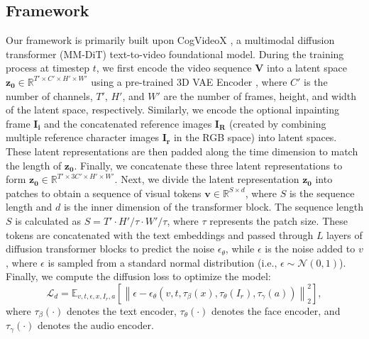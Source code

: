\subsection{Framework}
\label{framework}
Our framework is primarily built upon CogVideoX \cite{yang2024cogvideox}, a multimodal diffusion transformer (MM-DiT) text-to-video foundational model. During the training process at timestep $t$, we first encode the video sequence $\mathbf{V}$ into a latent space $\mathbf{z_{0}} \in \mathbb{R}^{T' \times C' \times H' \times W'}$ using a pre-trained 3D VAE Encoder \cite{yang2024cogvideox}, where $C'$ is the number of channels, $T'$, $H'$, and $W'$ are the number of frames, height, and width of the latent space, respectively. 
Similarly, we encode the optional inpainting frame $\mathbf{I_i}$ and the concatenated reference images $\mathbf{I_{R}}$ (created by combining multiple reference character images $\mathbf{I_r}$ in the RGB space) into latent spaces. These latent representations are then padded along the time dimension to match the length of $\mathbf{z_{0}}$. Finally, we concatenate these three latent representations to form $\mathbf{z_{0}} \in \mathbb{R}^{T' \times 3C' \times H' \times W'}$.
Next, we divide the latent representation $\mathbf{z_{0}}$ into patches to obtain a sequence of 
visual tokens \( \mathbf{v} \in \mathbb{R}^{S \times d} \), where \( S \) is the sequence length and \( d \) is the inner dimension of the transformer block. The sequence length \( S \) is calculated as \( S = T' \cdot H' / \tau \cdot W' / \tau \), where \( \tau \) represents the patch size. 
These tokens are concatenated with the text embeddings and passed through $L$ layers of diffusion transformer blocks to predict the noise $ \epsilon_\theta $, while $ \epsilon $ is the noise added to $ v $, where $ \epsilon $ is sampled from a standard normal distribution (i.e., $ \epsilon \sim \mathcal{N}(0, 1) $).
Finally, we compute the diffusion loss to optimize the model:
\begin{equation}
    \mathcal{L}_{d} = \mathbb{E}_{v, t, \epsilon, x, I_r, a} \left[ \left\| \epsilon - \epsilon_\theta\left(v, t, \tau_\beta(x), \tau_\theta(I_r), \tau_\gamma(a)\right) \right\|_2^2 \right],
\end{equation}
where \( \tau_\beta(\cdot) \) denotes the text encoder, \( \tau_\theta(\cdot) \) denotes the face encoder, and \( \tau_\gamma(\cdot) \) denotes the audio encoder.

